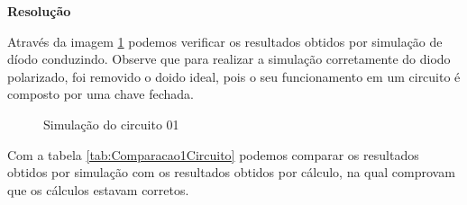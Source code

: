 \noindent
\textbf{Resolução}

\begin{Resolucao}[H]
    \label{res:Circuito01}
\end{Resolucao}

Através da imagem \ref{fig:SimulacaoCircuito01} podemos verificar os resultados obtidos por simulação de díodo conduzindo. Observe que para realizar a simulação corretamente do diodo polarizado, foi removido o doido ideal, pois o seu funcionamento em um circuito é composto por uma chave fechada.

\begin{figure}[H]
    \centering
    \caption{Simulação do circuito 01}
    \vspace{-0.3cm}
    \label{fig:SimulacaoCircuito01}
\end{figure}

Com a tabela \ref{tab:Comparacao1Circuito} podemos comparar os resultados obtidos por simulação com os resultados obtidos por cálculo, na qual comprovam que os cálculos estavam corretos.


